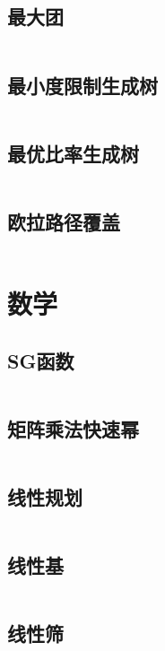 \documentclass[UTF8]{ctexart}
\begin{document}
\subsection{最大团}
\inputminted{cpp}{graphtheory/最大团.cpp}

\subsection{最小度限制生成树}
\inputminted{cpp}{graphtheory/最小度限制生成树.cpp}

\subsection{最优比率生成树}
\inputminted{cpp}{graphtheory/最优比率生成树.cpp}

\subsection{欧拉路径覆盖}
\inputminted{cpp}{graphtheory/欧拉路径覆盖.cpp}

\section{数学}



\subsection{SG函数}
\inputminted{cpp}{math/SG函数.cpp}

\subsection{矩阵乘法快速幂}
\inputminted{cpp}{math/矩阵乘法快速幂.cpp}

\subsection{线性规划}
\inputminted{cpp}{math/线性规划.cpp}

\subsection{线性基}
\inputminted{cpp}{math/线性基.cpp}

\subsection{线性筛}
\inputminted{cpp}{math/线性筛.cpp}
\end{document}

